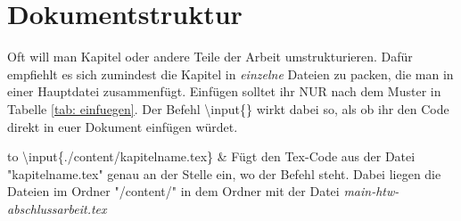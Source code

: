 \section{Dokumentstruktur}%
Oft will man Kapitel oder andere Teile der Arbeit umstrukturieren. Dafür empfiehlt es sich zumindest die Kapitel in \emph{einzelne} Dateien zu packen, die man in einer Hauptdatei zusammenfügt. Einfügen solltet ihr \textsc{NUR} nach dem Muster in Tabelle \ref{tab: einfuegen}. Der Befehl \textbackslash input\{\} wirkt dabei so, als ob ihr den Code direkt in euer Dokument einfügen würdet.%
\begin{table}[h]%

\begin{tabu} to \textwidth {X[c]X[c]}%
\toprule%
\textbackslash input\{./content/kapitelname.tex\} & Fügt den Tex-Code aus der Datei "kapitelname.tex" genau an der Stelle ein, wo der Befehl steht. Dabei liegen die Dateien im Ordner "/content/" in dem Ordner mit der Datei \emph{main-htw-abschlussarbeit.tex}\\%
\bottomrule%
\end{tabu}%
\caption{Dokumentstruktur durch Einfügen}%
\label{tab: einfuegen}%
\end{table}%
%
%

